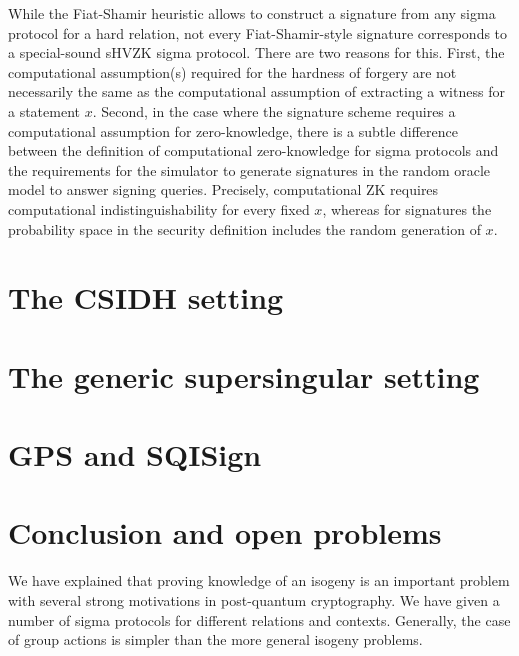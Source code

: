 \documentclass{llncs}
\begin{document}
While the Fiat-Shamir heuristic allows to construct a signature from any sigma protocol for a hard relation, not every Fiat-Shamir-style signature corresponds to a special-sound sHVZK sigma protocol.
There are two reasons for this.
First, the computational assumption(s) required for the hardness of forgery are not necessarily the same as the computational assumption of extracting a witness for a statement $x$.
Second, in the case where the signature scheme requires a computational assumption for zero-knowledge, there is a subtle difference between the definition of computational zero-knowledge for sigma protocols and the requirements for the simulator to generate signatures in the random oracle model to answer signing queries. 
Precisely, computational ZK requires computational indistinguishability for every fixed $x$, whereas for signatures the probability space in the security definition includes the random generation of $x$.







\section{The CSIDH setting\label{sec:CSIDH-setting}}






\section{The generic supersingular setting \label{sec:SIDH-setting}}





\section{GPS and SQISign\label{sec:GPSandSQIsign}}



\section{Conclusion and open problems\label{sec:conclusion}}

We have explained that proving knowledge of an isogeny is an important problem with several strong motivations in post-quantum cryptography.
%
We have given a number of sigma protocols for different relations and contexts. Generally, the case of group actions is simpler than the more general isogeny problems.
\end{document}
